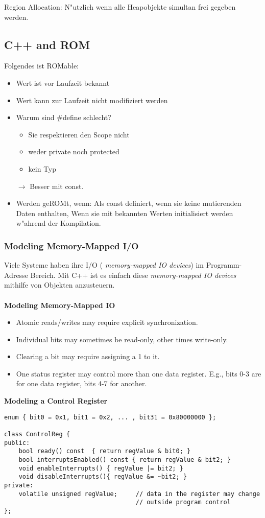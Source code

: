 Region Allocation: N"utzlich wenn alle Heapobjekte simultan frei gegeben werden. 

\subsection{C++ and ROM}
Folgendes ist ROMable: 
\begin{itemize}
\item Wert ist vor Laufzeit bekannt
\item Wert kann zur Laufzeit nicht modifiziert werden
\item Warum sind \#define schlecht?
	\begin{itemize}
		\item Sie respektieren den Scope nicht
		\item weder private noch protected
		\item kein Typ
	\end{itemize}
	$\rightarrow$ Besser mit const.
\item Werden geROMt, wenn: Als const definiert, wenn sie keine mutierenden
	Daten enthalten, Wenn sie mit bekannten Werten initialisiert werden
	w"ahrend der Kompilation.
\end{itemize}


\subsubsection{Modeling Memory-Mapped I/O}
Viele Systeme haben ihre I/O (\textit{ memory-mapped IO devices}) im Programm-Adresse Bereich. Mit C++ ist es einfach diese \textit{ memory-mapped IO devices} mithilfe von Objekten anzusteuern.\\ \\

\textbf{Modeling Memory-Mapped IO}
\begin{itemize}
	\item Atomic reads/writes may require explicit synchronization.
	\item Individual bits may sometimes be read-only, other times write-only.
	\item Clearing a bit may require assigning a 1 to it.
	\item One status register may control more than one data register.
		E.g., bits 0-3 are for one data register, bits 4-7 for another.	
\end{itemize}

\textbf{Modeling a Control Register}

\begin{lstlisting}
enum { bit0 = 0x1, bit1 = 0x2, ... , bit31 = 0x80000000 };

class ControlReg {
public:
	bool ready() const 	{ return regValue & bit0; }
	bool interruptsEnabled() const { return regValue & bit2; }
	void enableInterrupts() { regValue |= bit2; }
	void disableInterrupts(){ regValue &= ~bit2; }
private:
	volatile unsigned regValue;		// data in the register may change
									// outside program control
};
\end{lstlisting}

